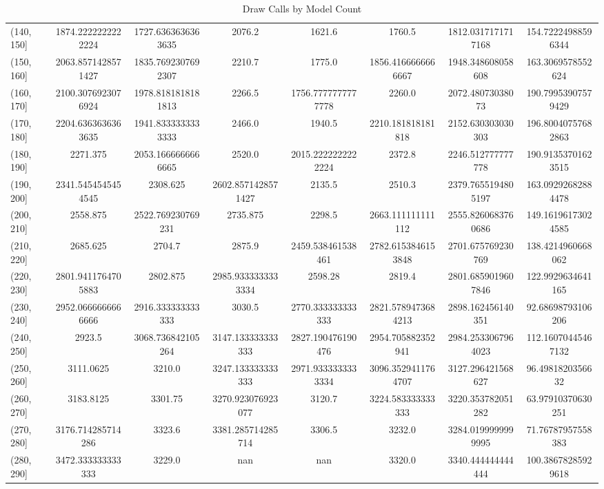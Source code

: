 \begin{table}[H]
\begin{tabular}{|l |c |c |c |c |c |c |c|}
(140, 150] & 1874.2222222222224 & 1727.6363636363635 & 2076.2 & 1621.6 & 1760.5 & 1812.0317171717168 & 154.72224988596344 \\
(150, 160] & 2063.8571428571427 & 1835.7692307692307 & 2210.7 & 1775.0 & 1856.4166666666667 & 1948.348608058608 & 163.3069578552624 \\
(160, 170] & 2100.3076923076924 & 1978.8181818181813 & 2266.5 & 1756.7777777777778 & 2260.0 & 2072.48073038073 & 190.79953907579429 \\
(170, 180] & 2204.6363636363635 & 1941.8333333333333 & 2466.0 & 1940.5 & 2210.181818181818 & 2152.630303030303 & 196.80040757682863 \\
(180, 190] & 2271.375 & 2053.1666666666665 & 2520.0 & 2015.2222222222224 & 2372.8 & 2246.512777777778 & 190.91353701623515 \\
(190, 200] & 2341.5454545454545 & 2308.625 & 2602.8571428571427 & 2135.5 & 2510.3 & 2379.7655194805197 & 163.09292682884478 \\
(200, 210] & 2558.875 & 2522.769230769231 & 2735.875 & 2298.5 & 2663.111111111112 & 2555.8260683760686 & 149.16196173024585 \\
(210, 220] & 2685.625 & 2704.7 & 2875.9 & 2459.538461538461 & 2782.6153846153848 & 2701.675769230769 & 138.4214960668062 \\
(220, 230] & 2801.9411764705883 & 2802.875 & 2985.9333333333334 & 2598.28 & 2819.4 & 2801.6859019607846 & 122.9929634641165 \\
(230, 240] & 2952.0666666666666 & 2916.333333333333 & 3030.5 & 2770.333333333333 & 2821.5789473684213 & 2898.162456140351 & 92.68698793106206 \\
(240, 250] & 2923.5 & 3068.736842105264 & 3147.133333333333 & 2827.190476190476 & 2954.705882352941 & 2984.2533067964023 & 112.16070445467132 \\
(250, 260] & 3111.0625 & 3210.0 & 3247.133333333333 & 2971.9333333333334 & 3096.3529411764707 & 3127.296421568627 & 96.4981820356632 \\
(260, 270] & 3183.8125 & 3301.75 & 3270.923076923077 & 3120.7 & 3224.583333333333 & 3220.353782051282 & 63.97910370630251 \\
(270, 280] & 3176.714285714286 & 3323.6 & 3381.285714285714 & 3306.5 & 3232.0 & 3284.0199999999995 & 71.76787957558383 \\
(280, 290] & 3472.333333333333 & 3229.0 & nan & nan & 3320.0 & 3340.444444444444 & 100.38678285929618 \\
\hline
\end{tabular}
\caption{Draw Calls by Model Count}
\label{tab:draw_calls}
\end{table}
